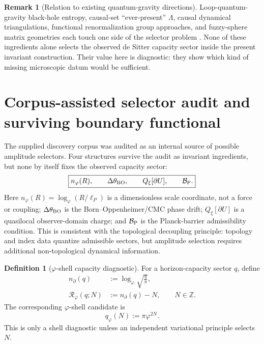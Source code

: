 \documentclass[aps,prd,reprint,nofootinbib,superscriptaddress,floatfix]{revtex4-2}
\numberwithin{equation}{section}
\theoremstyle{definition}
\newtheorem{definition}{Definition}[section]
\newtheorem{remark}{Remark}[section]
\theoremstyle{plain}
\begin{document}
\begin{remark}[Relation to existing quantum-gravity directions]
Loop-quantum-gravity black-hole entropy, causal-set ``ever-present'' \(\Lambda\), causal dynamical triangulations, functional renormalization group approaches, and fuzzy-sphere matrix geometries each touch one side of the selector problem \cite{Rovelli1996,Ashtekar1998,Jacobson2007,DiazPoloPranzetti2011,BarberoPranzetti2022,Sorkin2007,Zwane2017,Loll2020,Saueressig2023,Hasebe2025}.  None of these ingredients alone selects the observed de Sitter capacity sector inside the present invariant construction.  Their value here is diagnostic: they show which kind of missing microscopic datum would be sufficient.
\end{remark}



\section{Corpus-assisted selector audit and surviving boundary functional}
\label{sec:corpus-selector}

The supplied discovery corpus was audited as an internal source of possible
amplitude selectors.  Four structures survive the audit as invariant ingredients,
but none by itself fixes the observed capacity sector:
\begin{equation}
\boxed{
n_\varphi(R),\qquad
\Delta\theta_{\rm BO},\qquad
Q_\xi[\partial U],\qquad
\mathcal B_{\rm P}.
}
\end{equation}
Here \(n_\varphi(R)=\log_\varphi(R/\ell_P)\) is a dimensionless scale
coordinate, not a force or coupling; \(\Delta\theta_{\rm BO}\) is the
Born--Oppenheimer/CMC phase drift; \(Q_\xi[\partial U]\) is a quasilocal
observer-domain charge; and \(\mathcal B_{\rm P}\) is the Planck-barrier
admissibility condition.  This is consistent with the topological decoupling
principle: topology and index data quantize admissible sectors, but amplitude
selection requires additional non-topological dynamical information.

\begin{definition}[\(\varphi\)-shell capacity diagnostic]
For a horizon-capacity sector \(q\), define
\begin{align}
n_\partial(q)&:=\log_\varphi\sqrt{\frac{q}{\pi}},\\
\mathcal R_\varphi(q;N)&:=n_\partial(q)-N,\qquad N\in\mathbb Z .
\end{align}
The corresponding \(\varphi\)-shell candidate is
\begin{equation}
q_\varphi(N):=\pi\varphi^{2N}.
\end{equation}
This is only a shell diagnostic unless an independent variational principle
selects \(N\).
\end{definition}
\end{document}
